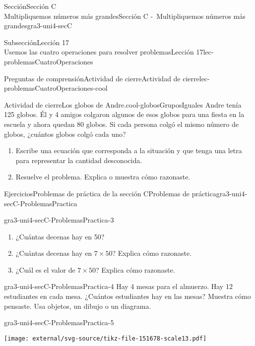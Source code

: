 \begin{sectionptx}{Sección}{{\Large Sección C\\}Multipliquemos números más grandes}{}{Sección C -~Multipliquemos números más grandes}{}{}{gra3-uni4-secC}
\begin{subsectionptx}{Subsección}{{\normalsize Lección 17\\[-0.05cm]}Usemos las cuatro operaciones para resolver problemas}{}{Lección 17}{}{}{lec-problemasCuatroOperaciones}
\begin{reading-questions-subsubsection}{Preguntas de comprensión}{Actividad de cierre}{}{Actividad de cierre}{}{}{lec-problemasCuatroOperaciones-cool}
\begin{project}{Actividad de cierre}{Los globos de Andre.}{cool-globosGruposIguales}%
Andre tenía 125 globos. Él y 4 amigos colgaron algunos de esos globos para una fiesta en la escuela y ahora quedan 80 globos. Si cada persona colgó el mismo número de globos, ¿cuántos globos colgó cada uno?%
%
\begin{enumerate}[label={(\alph*)}]
\item{}Escribe una ecuación que corresponda a la situación y que tenga una letra para representar la cantidad desconocida.%
\item{}Resuelve el problema. Explica o muestra cómo razonaste.%
\end{enumerate}
\end{project}%
\end{reading-questions-subsubsection}
\end{subsectionptx}
%
%
\typeout{************************************************}
\typeout{************************************************}
%
\begin{exercises-subsection}{Ejercicios}{Problemas de práctica de la sección C}{}{Problemas de práctica}{}{}{gra3-uni4-secC-ProblemasPractica}
\begin{divisionexercise}{1}{}{}{gra3-uni4-secC-ProblemasPractica-3}%
%
\begin{enumerate}[label={(\alph*)}]
\item{}¿Cuántas decenas hay en 50?%
\item{}¿Cuántas decenas hay en \(7 \times 50\)? Explica cómo razonaste.%
\item{}¿Cuál es el valor de \(7 \times 50\)? Explica cómo razonaste.%
\end{enumerate}
\end{divisionexercise}%
\begin{divisionexercise}{2}{}{}{gra3-uni4-secC-ProblemasPractica-4}%
Hay 4 mesas para el almuerzo. Hay 12 estudiantes en cada mesa. ¿Cuántos estudiantes hay en las mesas? Muestra cómo pensaste. Usa objetos, un dibujo o un diagrama.%
\end{divisionexercise}%
\begin{divisionexercise}{3}{}{}{gra3-uni4-secC-ProblemasPractica-5}%
\begin{sidebyside}{2}{0.0125}{0.0125}{0.025}%
\begin{sbspanel}{0.35}%
\texttt{[image: external/svg-source/tikz-file-151678-scale13.pdf]}
\end{sbspanel}%

\end{sidebyside}
\end{divisionexercise}
\end{exercises-subsection}
\end{sectionptx}

